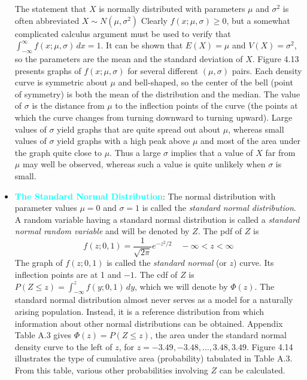 \documentclass{report}
\begin{document}
\begin{itemize}
        \bigbreak \noindent 
        The statement that $X$ is normally distributed with parameters $\mu$ and $\sigma^{2}$ is often abbreviated $X\sim N(\mu,\sigma^{2})$
        \bigbreak \noindent 
        Clearly \( f(x; \mu, \sigma) \geq 0 \), but a somewhat complicated calculus argument must be used to verify that \( \int_{-\infty}^{\infty} f(x; \mu, \sigma) \, dx = 1 \). It can be shown that \( E(X) = \mu \) and \( V(X) = \sigma^2 \), so the parameters are the mean and the standard deviation of \( X \). Figure 4.13 presents graphs of \( f(x; \mu, \sigma) \) for several different \((\mu, \sigma)\) pairs. Each density curve is symmetric about \( \mu \) and bell-shaped, so the center of the bell (point of symmetry) is both the mean of the distribution and the median. The value of \( \sigma \) is the distance from \( \mu \) to the inflection points of the curve (the points at which the curve changes from turning downward to turning upward). Large values of \( \sigma \) yield graphs that are quite spread out about \( \mu \), whereas small values of \( \sigma \) yield graphs with a high peak above \( \mu \) and most of the area under the graph quite close to \( \mu \). Thus a large \( \sigma \) implies that a value of \( X \) far from \( \mu \) may well be observed, whereas such a value is quite unlikely when \( \sigma \) is small.
        \bigbreak \noindent 
        \bigbreak \noindent 
    \item \textbf{\textcolor{cyan}{The Standard Normal Distribution}}:
        The normal distribution with parameter values \( \mu = 0 \) and \( \sigma = 1 \) is called the \textit{standard normal distribution}. A random variable having a standard normal distribution is called a \textit{standard normal random variable} and will be denoted by \( Z \). The pdf of \( Z \) is
        \[
            f(z; 0, 1) = \frac{1}{\sqrt{2\pi}} e^{-z^2/2} \quad -\infty < z < \infty
        \]
        \bigbreak \noindent 
        The graph of \( f(z; 0, 1) \) is called the \textit{standard normal} (or \( z \)) curve. Its inflection points are at 1 and \(-1\). The cdf of \( Z \) is \( P(Z \leq z) = \int_{-\infty}^{z} f(y; 0, 1) \, dy \), which we will denote by \( \Phi(z) \).
        \bigbreak \noindent 
        \bigbreak \noindent 
        The standard normal distribution almost never serves as a model for a naturally arising population. Instead, it is a reference distribution from which information about other normal distributions can be obtained. Appendix Table A.3 gives \( \Phi(z) = P(Z \leq z) \), the area under the standard normal density curve to the left of \( z \), for \( z = -3.49, -3.48, \ldots, 3.48, 3.49 \). Figure 4.14 illustrates the type of cumulative area (probability) tabulated in Table A.3. From this table, various other probabilities involving \( Z \) can be calculated.

\end{itemize}
\end{document}
